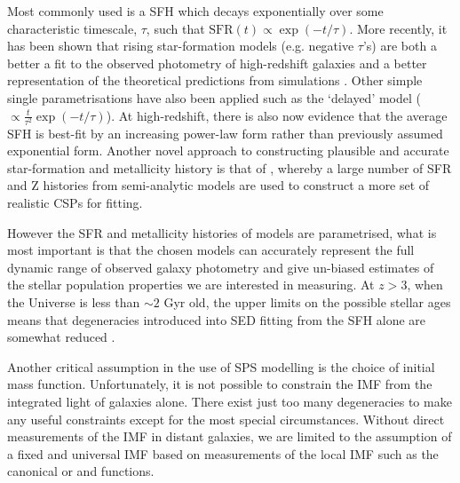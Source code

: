 Most commonly used is a SFH which decays exponentially over some characteristic timescale, $\tau$, such that $\text{SFR}(t) \propto \exp(-t/\tau)$. More recently, it has been shown that rising star-formation models (e.g. negative $\tau$'s) are both a better a fit to the observed photometry of high-redshift galaxies \citep{Maraston:2010dl} and a better representation of the theoretical predictions from simulations \citep{2011MNRAS.410.1703F,Dayal:2013jm}. Other simple single parametrisations have also been applied such as the `delayed' model ($\propto \frac{t}{\tau^{2}} \exp(-t/\tau)$). At high-redshift, there is also now evidence that the average SFH is best-fit by an increasing power-law form \citep{2011MNRAS.412.1123P,2015ApJ...799..183S} rather than previously assumed exponential form. Another novel approach to constructing plausible and accurate star-formation and metallicity history is that of \citet{Pacifici:2012fr}, whereby a large number of SFR and Z histories from semi-analytic models are used to construct a more set of realistic CSPs for fitting.

However the SFR and metallicity histories of models are parametrised, what is most important is that the chosen models can accurately represent the full dynamic range of observed galaxy photometry and give un-biased estimates of the stellar population properties we are interested in measuring. At $z > 3$, when the Universe is less than $\sim 2$ Gyr old, the upper limits on the possible stellar ages means that degeneracies introduced into SED fitting from the SFH alone are somewhat reduced \citep{2013A&A...549A...4S}.

Another critical assumption in the use of SPS modelling is the choice of initial mass function. Unfortunately, it is not possible to constrain the IMF from the integrated light of galaxies alone. There exist just too many degeneracies to make any useful constraints except for the most special circumstances.  Without direct measurements of the IMF in distant galaxies, we are limited to the assumption of a fixed and universal IMF based on measurements of the local IMF such as the canonical \citet{Salpeter:1955hz} or \citet{Chabrier:2003ki} and \citet{Kroupa:2001ki} functions. 

